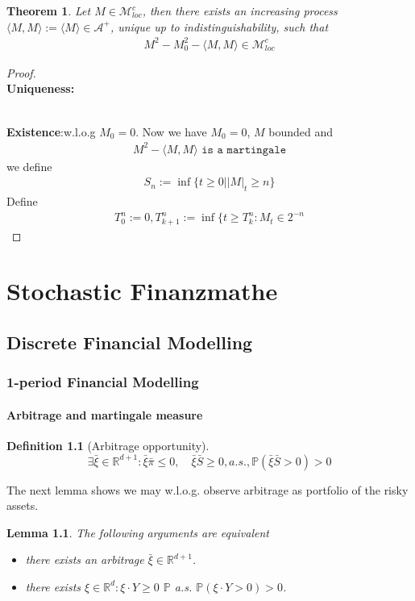 \documentclass[a4paper,11pt]{book}
\newtheorem{theorem}{Theorem}[section]
\newtheorem{lemma}[theorem]{Lemma}
\theoremstyle{definition}
\newtheorem{definition}{Definition}[section]
\theoremstyle{remark}
\begin{document}
\begin{theorem}
	Let $M \in \mathcal{M}_{loc}^c$, then there exists an increasing process $\langle M , M \rangle:= \langle M \rangle \in \mathcal{A}^+$, unique up to indistinguishability, such that 
	\begin{align*}
		M^2 - M_0^2 - \langle M, M \rangle \in \mathcal{M}_{loc}^c
	\end{align*}
\end{theorem}
\begin{proof}\quad\\
\textbf{Uniqueness:}

\quad\\
\textbf{Existence}:w.l.o.g $M_0 = 0$. Now we have $M_0 = 0$,  $M$ bounded and 
\begin{align*}
	M^2 - \langle M, M \rangle \texttt{ is a martingale}
\end{align*}
we define
\begin{align*}
	S_n:= \inf\{ t \ge 0 | |M|_t \ge n\}
\end{align*}
Define
\begin{align*}
	T_0^n:= 0, T_{k +1}^n:= \inf\{ t \ge T_k^n: M_t \in 2^{-n}
\end{align*}
\end{proof}


\chapter{Stochastic Finanzmathe}
\section{Discrete Financial Modelling}
\subsection{1-period Financial Modelling}
\subsubsection{Arbitrage and martingale measure}
\begin{definition}[Arbitrage opportunity]
\begin{equation*}
	\exists \bar{\xi} \in \mathbb{R}^{d+1}: \bar{\xi} \bar{\pi} \leq 0, \quad \bar{\xi} \bar{S} \geq 0, a.s., \mathbb{P}(\bar{\xi} \bar{S} > 0) > 0
\end{equation*}
\end{definition}


The next lemma shows we may w.l.o.g. observe arbitrage as portfolio of the risky assets. 
\begin{lemma}
	The following arguments are equivalent 
	\begin{itemize}
		\item there exists an arbitrage $\bar{\xi} \in \mathbb{R}^{d+1}$. 
		\item there exists $\xi \in \mathbb{R}^d: \xi \cdot Y \ge 0$ $\mathbb{P}$ a.s. $\mathbb{P}( \xi \cdot Y > 0) >0$. 
	\end{itemize}
\end{lemma}
\end{document}
